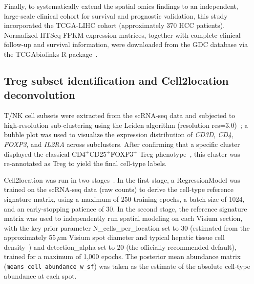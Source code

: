 \documentclass[12pt, a4paper]{article}
\begin{document}
Finally, to systematically extend the spatial omics findings to an independent, large-scale clinical cohort for survival and prognostic validation, this study incorporated the TCGA-LIHC cohort (approximately 370 HCC patients). Normalized HTSeq-FPKM expression matrices, together with complete clinical follow-up and survival information, were downloaded from the GDC database via the TCGAbiolinks R package~\citep{colaprico2016tcgabiolinks}.

\subsection{Treg subset identification and Cell2location deconvolution}

T/NK cell subsets were extracted from the scRNA-seq data and subjected to high-resolution sub-clustering using the Leiden algorithm (resolution res=3.0)~\citep{traag2019leiden}; a bubble plot was used to visualize the expression distribution of \textit{CD3D}, \textit{CD4}, \textit{FOXP3}, and \textit{IL2RA} across subclusters. After confirming that a specific cluster displayed the classical CD4$^+$CD25$^+$FOXP3$^+$ Treg phenotype~\citep{sakaguchi2020regulatory}, this cluster was re-annotated as Treg to yield the final cell-type labels.

Cell2location was run in two stages~\citep{kleshchevnikov2022cell2location}. In the first stage, a RegressionModel was trained on the scRNA-seq data (raw counts) to derive the cell-type reference signature matrix, using a maximum of 250 training epochs, a batch size of 1024, and an early-stopping patience of 30. In the second stage, the reference signature matrix was used to independently run spatial modeling on each Visium section, with the key prior parameter N\_cells\_per\_location set to 30 (estimated from the approximately 55\,$\mu$m Visium spot diameter and typical hepatic tissue cell density~\citep{kleshchevnikov2022cell2location}) and detection\_alpha set to 20 (the officially recommended default), trained for a maximum of 1,000 epochs. The posterior mean abundance matrix (\texttt{means\_cell\_abundance\_w\_sf}) was taken as the estimate of the absolute cell-type abundance at each spot.
\end{document}
